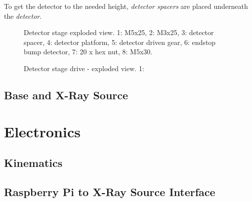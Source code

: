             To get the detector to the needed height, \textit{detector spacers} are placed underneath the \textit{detector}.\par\medskip

            \begin{figure}[t]
                \centering
                \caption[Detector stage exploded view.]{Detector stage exploded view. 1: M5x25, 2: M3x25, 3: detector spacer, 4: detector platform, 5: detector driven gear, 6: endstop bump detector, 7: 20 x hex nut, 8: M5x30.}%
                \label{fig:detector stage exploded}%
            \end{figure}
            

            \begin{figure}[h]
                \centering
                
                \caption[Detector stage drive - exploded view.]{Detector stage drive - exploded view. 1: }
                \label{fig:detector drive exploded}
            \end{figure}
        \subsection{Base and X-Ray Source}
            \lipsum

    \section{Electronics}
        \subsection{Kinematics}

        \subsection{Raspberry Pi to X-Ray Source Interface}